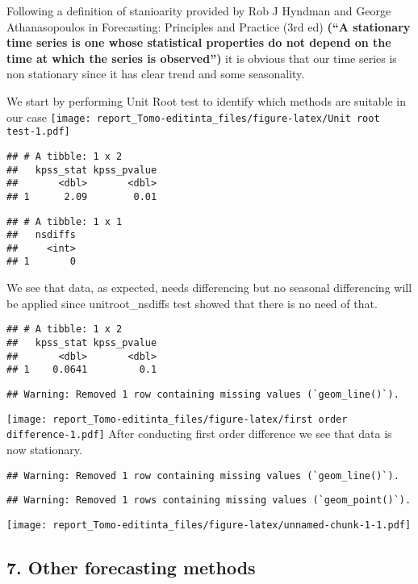 \documentclass[
]{article}
\begin{document}
Following a definition of stanioarity provided by Rob J Hyndman and
George Athanasopoulos in Forecasting: Principles and Practice (3rd ed)
\textbf{(``A stationary time series is one whose statistical properties
do not depend on the time at which the series is observed'')} it is
obvious that our time series is non stationary since it has clear trend
and some seasonality.

We start by performing Unit Root test to identify which methods are
suitable in our case
\texttt{[image: report\_Tomo-editinta\_files/figure-latex/Unit root test-1.pdf]}

\begin{verbatim}
## # A tibble: 1 x 2
##   kpss_stat kpss_pvalue
##       <dbl>       <dbl>
## 1      2.09        0.01
\end{verbatim}

\begin{verbatim}
## # A tibble: 1 x 1
##   nsdiffs
##     <int>
## 1       0
\end{verbatim}

We see that data, as expected, needs differencing but no seasonal
differencing will be applied since unitroot\_nsdiffs test showed that
there is no need of that.

\begin{verbatim}
## # A tibble: 1 x 2
##   kpss_stat kpss_pvalue
##       <dbl>       <dbl>
## 1    0.0641         0.1
\end{verbatim}

\begin{verbatim}
## Warning: Removed 1 row containing missing values (`geom_line()`).
\end{verbatim}

\texttt{[image: report\_Tomo-editinta\_files/figure-latex/first order difference-1.pdf]}
After conducting first order difference we see that data is now
stationary.

\begin{verbatim}
## Warning: Removed 1 row containing missing values (`geom_line()`).
\end{verbatim}

\begin{verbatim}
## Warning: Removed 1 rows containing missing values (`geom_point()`).
\end{verbatim}

\texttt{[image: report\_Tomo-editinta\_files/figure-latex/unnamed-chunk-1-1.pdf]}

\hypertarget{other-forecasting-methods}{%
\subsection{7. Other forecasting
methods}\label{other-forecasting-methods}}
\end{document}
